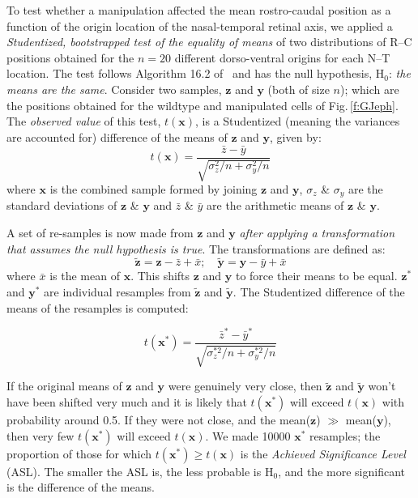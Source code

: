 \documentclass[9pt,lineno,draft]{elife}
\begin{document}
To test whether a manipulation affected the mean rostro-caudal position as a function of the origin location of the nasal-temporal retinal axis, we applied a \emph{Studentized, bootstrapped test of the equality of means} of two distributions of R--C positions obtained for the $n=20$ different dorso-ventral origins for each N--T location.
The test follows Algorithm 16.2 of~\cite{efron_introduction_1993} and has the null hypothesis, H$_0$: \emph{the means are the same}.
Consider two samples, $\textbf{z}$ and $\textbf{y}$ (both of size $n$); which are the positions obtained for the wildtype and manipulated cells of Fig.\,\ref{f:GJeph}.
The \emph{observed value} of this test, $t(\textbf{x})$, is a Studentized (meaning the variances are accounted for) difference of the means of $\textbf{z}$ and $\textbf{y}$, given by:
%
$$t(\textbf{x}) =  \frac{\bar{z} - \bar{y}}{\sqrt{\sigma_{z}^2/n + \sigma_{y}^2/n} } $$
%
where $\textbf{x}$ is the combined sample formed by joining $\textbf{z}$ and $\textbf{y}$, $\sigma_z$ \& $\sigma_y$ are the standard deviations of $\textbf{z}$ \& $\textbf{y}$ and $\bar{z}$ \& $\bar{y}$ are the arithmetic means of $\textbf{z}$ \& $\textbf{y}$.

A set of re-samples is now made from $\textbf{z}$ and $\textbf{y}$ \emph{after applying a transformation that assumes the null hypothesis is true}.
The transformations are defined as:
%
$$ \tilde{\textbf{z}} = \textbf{z} - \bar{z} + \bar{x}; \quad \tilde{\textbf{y}} = \textbf{y} - \bar{y} + \bar{x} $$
%
where $\bar{x}$ is the mean of $\textbf{x}$. This shifts $\textbf{z}$ and $\textbf{y}$ to force their means to be equal.
$\textbf{z}^*$ and $\textbf{y}^*$ are individual resamples from $\tilde{\textbf{z}}$ and $\tilde{\textbf{y}}$.
The Studentized difference of the means of the resamples is computed:

$$t(\textbf{x}^*) =  \frac{\bar{z}^* - \bar{y}^*}{\sqrt{\sigma_{z}^{*2}/n + \sigma_{y}^{*2}/n} } $$

If the original means of $\textbf{z}$ and $\textbf{y}$ were genuinely very close, then $\tilde{\textbf{z}}$ and $\tilde{\textbf{y}}$ won't have been shifted very much and it is likely that $t(\textbf{x}^*)$ will exceed $t(\textbf{x})$ with probability around 0.5.
If they were not close, and the mean($\textbf{z}$) $\gg$ mean($\textbf{y}$), then very few $t(\textbf{x}^*)$ will exceed $t(\textbf{x})$.
We made 10000 $\textbf{x}^*$ resamples; the proportion of those for which $t(\textbf{x}^*) \geq t(\textbf{x})$ is the \emph{Achieved Significance Level} (ASL).
The smaller the ASL is, the less probable is H$_0$, and the more significant is the difference of the means.
\end{document}
